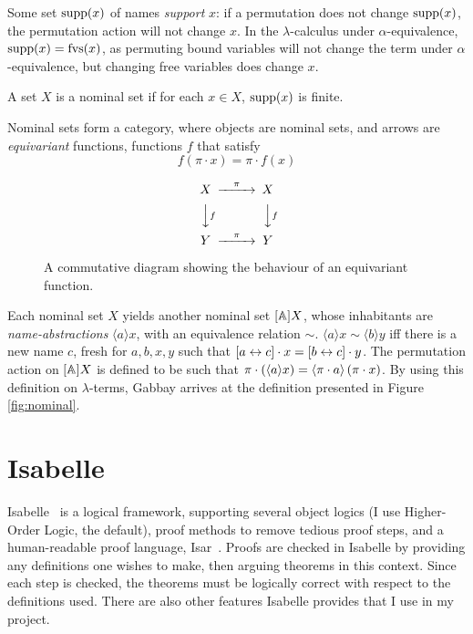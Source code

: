 Some set \(\mathrm{supp}(x)\) of names \emph{support} \(x\): if a permutation does not change \(\mathrm{supp}(x)\), the permutation action will not change \(x\).
In the \(\lambda\)-calculus under \(\alpha\)-equivalence, \(\mathrm{supp}(x) = \mathrm{fvs}(x)\), as permuting bound variables will not change the term under \(\alpha\)-equivalence, but changing free variables does change \(x\).

\begin{definition}
A set \(X\) is a nominal set if for each \(x \in X\), \(\mathrm{supp}(x)\) is finite.
\end{definition}

Nominal sets form a category, where objects are nominal sets, and arrows are \emph{equivariant} functions, functions \(f\) that satisfy
\[
f(\pi \cdot x) = \pi \cdot f(x)
\]

\begin{figure}
\[
\begin{CD}
X	@>\pi>>	X\\
@VVfV		@VVfV\\
Y	@>\pi>>	Y
\end{CD}
\]
\caption{A commutative diagram showing the behaviour of an equivariant function.}
\label{fig:equivariant}
\end{figure}

Each nominal set \(X\) yields another nominal set \([\mathbb{A}]X\), whose inhabitants are \emph{name-abstractions} \(\langle a \rangle x\), with an equivalence relation \(\sim\).
\(\langle a \rangle x \sim \langle b \rangle y\) iff there is a new name \(c\), fresh for \(a, b, x, y\) such that \([a \leftrightarrow c] \cdot x = [b \leftrightarrow c] \cdot y\).
The permutation action on \([\mathbb{A}]X\) is defined to be such that \(\pi \cdot \left(\langle a \rangle x\right) = \langle \pi \cdot a \rangle\left(\pi \cdot x\right)\).
By using this definition on \(\lambda\)-terms, Gabbay arrives at the definition presented in Figure \ref{fig:nominal}.

\section{Isabelle}
\label{sec:isabelle-intro}
Isabelle~\cite{isabelle} is a logical framework, supporting several object logics (I use Higher-Order Logic, the default), proof methods to remove tedious proof steps, and a human-readable proof language, Isar~\cite{isar-phd}.
Proofs are checked in Isabelle by providing any definitions one wishes to make, then arguing theorems in this context.
Since each step is checked, the theorems must be logically correct with respect to the definitions used.
There are also other features Isabelle provides that I use in my project.

